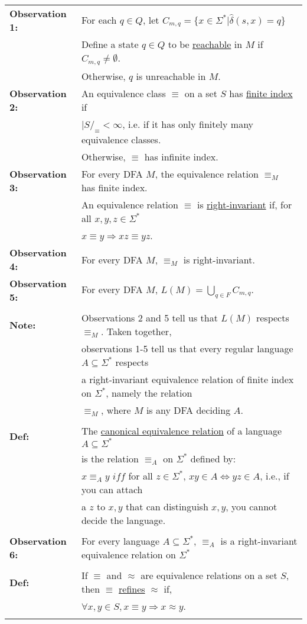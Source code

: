 \documentclass[11pt]{article}
\begin{document}
\begin{tabular}{ll}
{\bf Observation 1:} & For each $q\in Q$, let $C_{m,q} = \{x\in\Sigma^*|\hat{\delta}(s,x)=q\}$ \\
& Define a state $q\in Q$ to be \underline{reachable} in $M$ if $C_{m,q}\neq\emptyset$.\\
& Otherwise, $q$ is unreachable in $M$. \\
{\bf Observation 2:} & An equivalence class $\equiv$ on a set $S$ has \underline{finite index} if \\
& $|S/_\equiv < \infty$, i.e. if it has only finitely many equivalence classes. \\
& Otherwise, $\equiv$ has infinite index. \\
{\bf Observation 3:} & For every DFA $M$, the equivalence relation $\equiv_M$ has finite index.\\
& An equivalence relation $\equiv$ is \underline{right-invariant} if, for all $x,y,z\in\Sigma^*$\\
& $x \equiv y \Rightarrow xz \equiv yz$.\\
{\bf Observation 4:} & For every DFA $M$, $\equiv_M$ is right-invariant.\\
{\bf Observation 5:} & For every DFA $M$, $L(M)=\bigcup\limits_{q\in F}C_{m,q}$.\\
\\
{\bf Note:} & Observations 2 and 5 tell us that $L(M)$ respects $\equiv_M$. Taken together, \\
& observations 1-5 tell us that every regular language $A\subseteq\Sigma^*$ respects \\
& a right-invariant equivalence relation of finite index on $\Sigma^*$, namely the relation \\
& $\equiv_M$, where $M$ is any DFA deciding $A$.\\
\\
{\bf Def:} & The \underline{canonical equivalence relation} of a language $A\subseteq\Sigma^*$\\
& is the relation $\equiv_A$ on $\Sigma^*$ defined by: \\
& $x \equiv_A y$ $\textit{iff}$ for all $z \in \Sigma^*$, $xy\in A \Leftrightarrow yz \in A$, i.e., if you can attach \\
& a $z$ to $x,y$ that can distinguish $x,y$, you cannot decide the language. \\
\\
{\bf Observation 6:} & For every language $A\subseteq\Sigma^*$, $\equiv_A$ is a right-invariant equivalence relation on $\Sigma^*$ \\
\\
{\bf Def:} & If $\equiv$ and $\approx$ are equivalence relations on a set $S$, then $\equiv$ \underline{refines} $\approx$ if, \\
& $\forall x,y \in S, x \equiv y \Rightarrow x \approx y$. \\
\\
\end{tabular}
\end{document}
